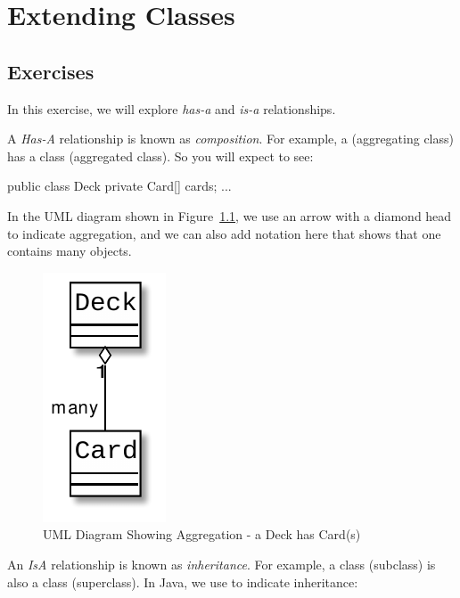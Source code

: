 \chapter{Extending Classes}

\section{Exercises}

\begin{exercise}
In this exercise, we will explore {\em has-a} and {\em is-a} relationships.

A {\em Has-A} relationship is known as {\em composition}. For example, a  (aggregating class) has a  class (aggregated class). So you will expect to see:

\begin{code}
public class Deck {
    private Card[] cards; 
    ...
}
\end{code}

In the UML diagram shown in Figure~\ref{fig.aggregation}, we use an arrow with a diamond head to indicate aggregation, and we can also add notation here that shows that one  contains many  objects.

\begin{figure}[!h]
\begin{center}
\includegraphics[scale=0.75]{figs/ch14/aggregation.pdf}
\caption{UML Diagram Showing Aggregation - a Deck has Card(s)}
\label{fig.aggregation}
\end{center}
\end{figure}

An {\em Is\-A} relationship is known as {\em inheritance}. For example, a  class (subclass) is also a  class (superclass). In Java, we use  to indicate inheritance:


\end{exercise}
